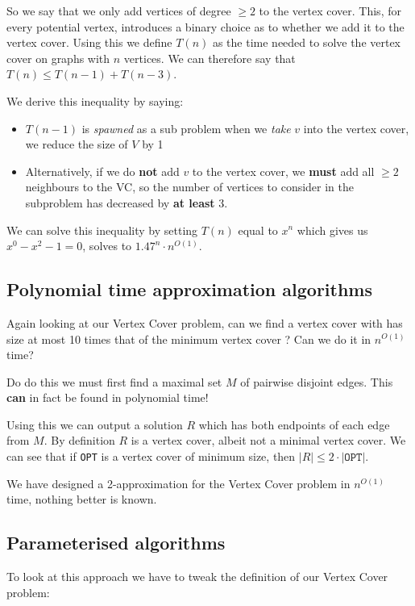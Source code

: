 \documentclass{article}
\begin{document}
So we say that we only add vertices of degree $\geq 2$ to the vertex cover. This, for every potential vertex, introduces a binary choice as to whether we add it to the vertex cover. Using this we define $T(n)$ as the time needed to solve the vertex cover on graphs with $n$ vertices. We can therefore say that $T(n) \leq T(n-1) + T(n-3)$.

We derive this inequality by saying:

\begin{itemize}
  \item $T(n-1)$ is \textit{spawned} as a sub problem when we \textit{take} $v$ into the vertex cover, we reduce the size of $V$ by 1
        \item Alternatively, if we do \textbf{not} add $v$ to the vertex cover, we \textbf{must} add all $\geq2$ neighbours to the VC, so the number of vertices to consider in the subproblem has decreased by \textbf{at least} 3.
\end{itemize}

We can solve this inequality by setting $T(n)$ equal to $x^{n}$ which gives us $x^{0} - x^{2} -1 = 0 $, solves to $1.47^{n} \cdot n^{O(1)}$.


\subsection{Polynomial time approximation algorithms}

Again looking at our Vertex Cover problem, can we find a vertex cover with has size at most 10 times that of the minimum vertex cover ? Can we do it in $n^{O(1)}$ time?

Do do this we must first find a maximal set $M$ of pairwise disjoint edges. This \textbf{can} in fact be found in polynomial time!

Using this we can output a solution $R$ which has both endpoints of each edge from $M$. By definition $R$ is a vertex cover, albeit not a minimal vertex cover. We can see that if \texttt{OPT} is a vertex cover of minimum size, then $|R|\leq 2\cdot |\texttt{OPT}| $.

We have designed a 2-approximation for the Vertex Cover problem in $n^{O(1)}$ time, nothing better is known.

\subsection{Parameterised algorithms}

To look at this approach we have to tweak the definition of our Vertex Cover problem:
\end{document}
